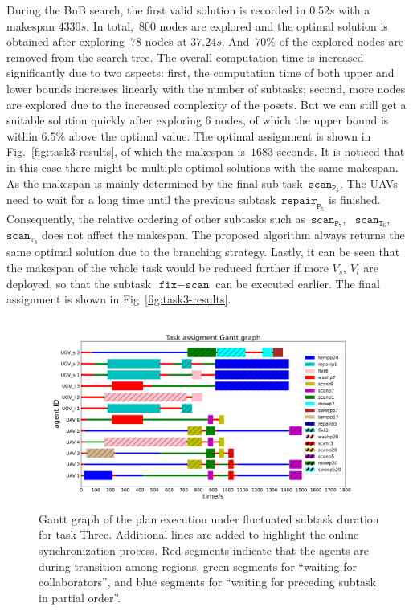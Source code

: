 During the BnB search,
the first valid solution is recorded in $0.52s$ with a makespan $4330s$.
In total,~$800$ nodes are explored and the optimal solution is obtained
after exploring~$78$ nodes at $37.24s$. And~$70\%$ of the explored nodes
are removed from the search tree.
The overall computation time is increased significantly due to two aspects:
first, the computation time of both upper and lower bounds
increases linearly with the number of subtasks;
second, more nodes are explored due to the increased complexity
of the posets. But we can still
get a suitable solution quickly after exploring $6$ nodes,
of which the upper bound is within $6.5\%$ above the
optimal value.
The optimal assignment is shown in Fig.~\ref{fig:task3-results},
of which the makespan is~$1683$ seconds.
It is noticed that in this case there might be multiple optimal solutions
with the same makespan.
As the makespan is mainly determined by the final sub-task~$\texttt{scan}_{\texttt{P}_5}$.
The UAVs need to wait for a long time until the previous
subtask~$\texttt{repair}_{\texttt{P}_5}$ is finished. Consequently, the relative ordering
of other subtasks such as~$\texttt{scan}_{\texttt{P}_7}$,
~$\texttt{scan}_{\texttt{T}_6}$,~$\texttt{scan}_{\texttt{T}_3}$
does not affect the makespan.
The proposed algorithm always returns the same optimal solution due to the branching
strategy. Lastly, it can be seen that the makespan of the whole task would be reduced
further if more $V_s,\,V_l$ are deployed,
so that the subtask~$\texttt{fix}-\texttt{scan}$ can be executed earlier.
The final assignment is shown in Fig~\ref{fig:task3-results}.
\begin{figure}[t!]
	\includegraphics[scale=0.180]{figures/simulation/onlineadaptive/gantt_1_adapt.pdf}
	\caption{
Gantt graph of the plan execution under fluctuated subtask duration for task Three.
Additional lines are added to highlight the online synchronization process.
Red segments indicate that the agents are during transition among regions,
green segments for ``waiting for collaborators'',
and blue segments for ``waiting for preceding subtask in partial order''.}
	\label{fig:gantt-online-task3}
\end{figure}

